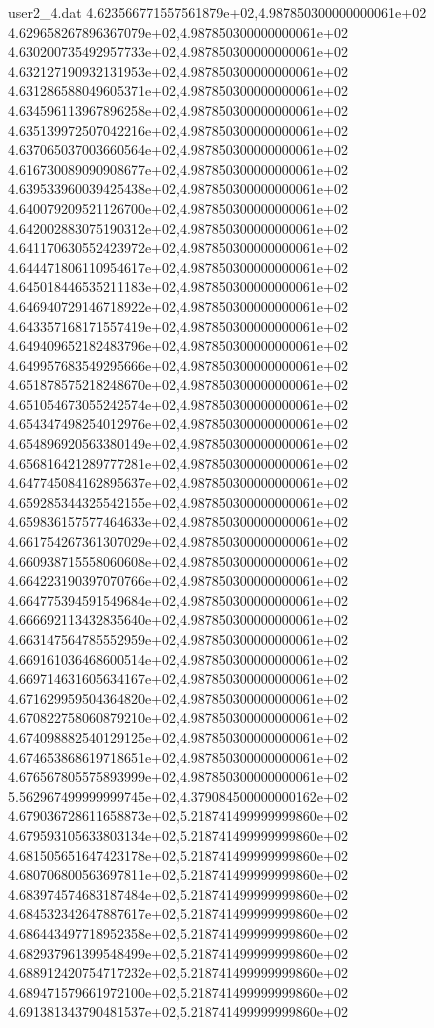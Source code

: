 \begin{filecontents}{user2_4.dat}
4.623566771557561879e+02,4.987850300000000061e+02
4.629658267896367079e+02,4.987850300000000061e+02
4.630200735492957733e+02,4.987850300000000061e+02
4.632127190932131953e+02,4.987850300000000061e+02
4.631286588049605371e+02,4.987850300000000061e+02
4.634596113967896258e+02,4.987850300000000061e+02
4.635139972507042216e+02,4.987850300000000061e+02
4.637065037003660564e+02,4.987850300000000061e+02
4.616730089090908677e+02,4.987850300000000061e+02
4.639533960039425438e+02,4.987850300000000061e+02
4.640079209521126700e+02,4.987850300000000061e+02
4.642002883075190312e+02,4.987850300000000061e+02
4.641170630552423972e+02,4.987850300000000061e+02
4.644471806110954617e+02,4.987850300000000061e+02
4.645018446535211183e+02,4.987850300000000061e+02
4.646940729146718922e+02,4.987850300000000061e+02
4.643357168171557419e+02,4.987850300000000061e+02
4.649409652182483796e+02,4.987850300000000061e+02
4.649957683549295666e+02,4.987850300000000061e+02
4.651878575218248670e+02,4.987850300000000061e+02
4.651054673055242574e+02,4.987850300000000061e+02
4.654347498254012976e+02,4.987850300000000061e+02
4.654896920563380149e+02,4.987850300000000061e+02
4.656816421289777281e+02,4.987850300000000061e+02
4.647745084162895637e+02,4.987850300000000061e+02
4.659285344325542155e+02,4.987850300000000061e+02
4.659836157577464633e+02,4.987850300000000061e+02
4.661754267361307029e+02,4.987850300000000061e+02
4.660938715558060608e+02,4.987850300000000061e+02
4.664223190397070766e+02,4.987850300000000061e+02
4.664775394591549684e+02,4.987850300000000061e+02
4.666692113432835640e+02,4.987850300000000061e+02
4.663147564785552959e+02,4.987850300000000061e+02
4.669161036468600514e+02,4.987850300000000061e+02
4.669714631605634167e+02,4.987850300000000061e+02
4.671629959504364820e+02,4.987850300000000061e+02
4.670822758060879210e+02,4.987850300000000061e+02
4.674098882540129125e+02,4.987850300000000061e+02
4.674653868619718651e+02,4.987850300000000061e+02
4.676567805575893999e+02,4.987850300000000061e+02
5.562967499999999745e+02,4.379084500000000162e+02
4.679036728611658873e+02,5.218741499999999860e+02
4.679593105633803134e+02,5.218741499999999860e+02
4.681505651647423178e+02,5.218741499999999860e+02
4.680706800563697811e+02,5.218741499999999860e+02
4.683974574683187484e+02,5.218741499999999860e+02
4.684532342647887617e+02,5.218741499999999860e+02
4.686443497718952358e+02,5.218741499999999860e+02
4.682937961399548499e+02,5.218741499999999860e+02
4.688912420754717232e+02,5.218741499999999860e+02
4.689471579661972100e+02,5.218741499999999860e+02
4.691381343790481537e+02,5.218741499999999860e+02

\end{filecontents}
